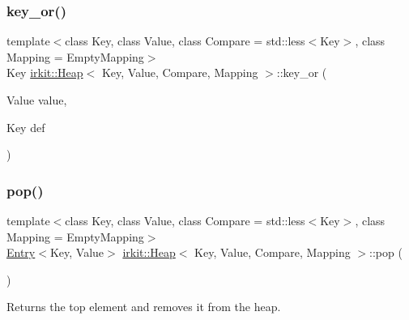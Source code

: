 \mbox{\label{classirkit_1_1Heap_a2fffaaf281662d57d13dcc1b0618dc0d}} 
\subsubsection{\texorpdfstring{key\+\_\+or()}{key\_or()}}
{\footnotesize\ttfamily template$<$class Key, class Value, class Compare = std\+::less$<$\+Key$>$, class Mapping = Empty\+Mapping$>$ \\
Key \hyperlink{classirkit_1_1Heap}{irkit\+::\+Heap}$<$ Key, Value, Compare, Mapping $>$\+::key\+\_\+or (\begin{DoxyParamCaption}\item[{Value}]{value,  }\item[{Key}]{def }\end{DoxyParamCaption})\hspace{0.3cm}{\ttfamily [inline]}}

\mbox{\label{classirkit_1_1Heap_afd4759dce1fe72d513e4b8e7766ec94e}} 
\subsubsection{\texorpdfstring{pop()}{pop()}}
{\footnotesize\ttfamily template$<$class Key, class Value, class Compare = std\+::less$<$\+Key$>$, class Mapping = Empty\+Mapping$>$ \\
\hyperlink{structirkit_1_1Entry}{Entry}$<$Key, Value$>$ \hyperlink{classirkit_1_1Heap}{irkit\+::\+Heap}$<$ Key, Value, Compare, Mapping $>$\+::pop (\begin{DoxyParamCaption}{ }\end{DoxyParamCaption})\hspace{0.3cm}{\ttfamily [inline]}}



Returns the top element and removes it from the heap. 

\mbox{\label{classirkit_1_1Heap_aa94f791b5b26659cc41a39fd58d138e4}} 
